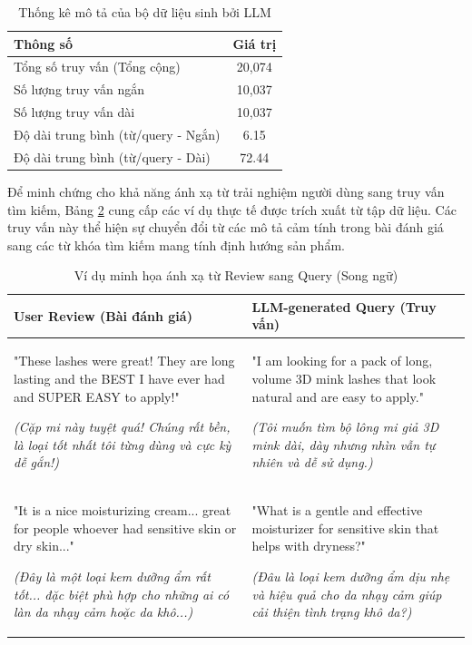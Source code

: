 \begin{table}[h]
\centering
\caption{Thống kê mô tả của bộ dữ liệu sinh bởi LLM}
\label{tab:dataset_stats_llm} %
\begin{tabular}{|l|c|}
\hline
\textbf{Thông số} & \textbf{Giá trị} \\ \hline
Tổng số truy vấn (Tổng cộng) & 20,074 \\ \hline
Số lượng truy vấn ngắn & 10,037 \\ \hline
Số lượng truy vấn dài & 10,037 \\ \hline
Độ dài trung bình (từ/query - Ngắn) & 6.15 \\ \hline
Độ dài trung bình (từ/query - Dài) & 72.44 \\ \hline
\end{tabular}
\end{table}

Để minh chứng cho khả năng ánh xạ từ trải nghiệm người dùng sang truy vấn tìm kiếm, Bảng \ref{tab:review_to_query_examples_bilingual} cung cấp các ví dụ thực tế được trích xuất từ tập dữ liệu. Các truy vấn này thể hiện sự chuyển đổi từ các mô tả cảm tính trong bài đánh giá sang các từ khóa tìm kiếm mang tính định hướng sản phẩm.

\begin{table}[ht]
\centering
\small
\caption{Ví dụ minh họa ánh xạ từ Review sang Query (Song ngữ)}
\label{tab:review_to_query_examples_bilingual} 
\renewcommand{\arraystretch}{1.5} 
\begin{tabularx}{\textwidth}{X | X}
\toprule
\textbf{User Review (Bài đánh giá)} & \textbf{LLM-generated Query (Truy vấn)} \\ 
\midrule
"These lashes were great! They are long lasting and the BEST I have ever had and SUPER EASY to apply!" 

\textit{(Cặp mi này tuyệt quá! Chúng rất bền, là loại tốt nhất tôi từng dùng và cực kỳ dễ gắn!)} & 
"I am looking for a pack of long, volume 3D mink lashes that look natural and are easy to apply." 

\textit{(Tôi muốn tìm bộ lông mi giả 3D mink dài, dày nhưng nhìn vẫn tự nhiên và dễ sử dụng.)} \\ 
\midrule
"It is a nice moisturizing cream... great for people whoever had sensitive skin or dry skin..." 

\textit{(Đây là một loại kem dưỡng ẩm rất tốt... đặc biệt phù hợp cho những ai có làn da nhạy cảm hoặc da khô...)} & 
"What is a gentle and effective moisturizer for sensitive skin that helps with dryness?" 

\textit{(Đâu là loại kem dưỡng ẩm dịu nhẹ và hiệu quả cho da nhạy cảm giúp cải thiện tình trạng khô da?)} \\ 
\bottomrule
\end{tabularx}
\end{table}

